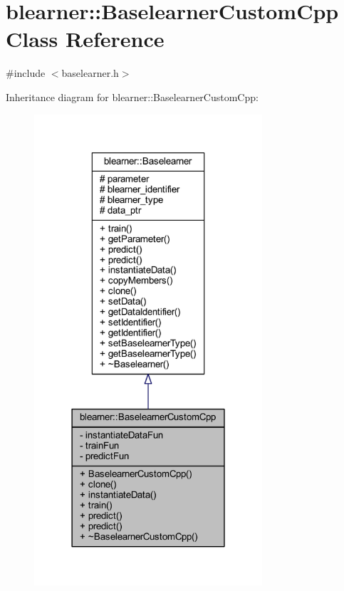 \hypertarget{classblearner_1_1_baselearner_custom_cpp}{}\section{blearner\+:\+:Baselearner\+Custom\+Cpp Class Reference}
\label{classblearner_1_1_baselearner_custom_cpp}


{\ttfamily \#include $<$baselearner.\+h$>$}



Inheritance diagram for blearner\+:\+:Baselearner\+Custom\+Cpp\+:
\nopagebreak
\begin{figure}[H]
\begin{center}
\leavevmode
\includegraphics[width=240pt]{classblearner_1_1_baselearner_custom_cpp__inherit__graph}
\end{center}
\end{figure}



